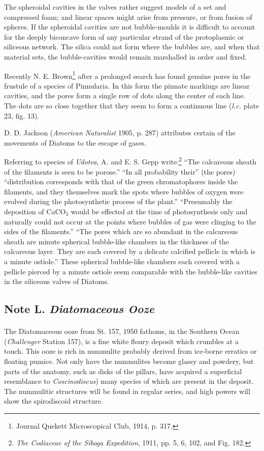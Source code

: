 \documentclass[a4paper, 12pt, oneside]{article}
\begin{document}
The spheroidal cavities in the valves rather suggest models of a set and compressed foam; and linear spaces might arise from pressure, or from fusion of spheres. If the spheroidal cavities are not bubble-moulds it is difficult to account for the deeply biconcave form of any particular strand of the protoplasmic or siliceous network. The silica could not form where the bubbles are, and when that material sets, the bubble-cavities would remain marshalled in order and fixed.

Recently N. E. Brown\footnote{Journal Quekett Microscopical Club, 1914, p. 317.} after a prolonged search has found genuine pores in the frustule of a species of Pinnularia. In this form the pinnate markings are linear cavities, and the pores form a single row of dots along the center of each line. The dots are so close together that they seem to form a continuous line (\emph{l.c.} plate 23, fig. 13).

D. D. Jackson (\emph{American Naturalist} 1905, p. 287) attributes certain of the movements of Diatoms to the escape of gases.

Referring to species of \emph{Udotea}, A. and E. S. Gepp write:\footnote{\emph{The Codiaceae of the \emph{Siboga} Expedition}, 1911, pp. 5, 6, 102, and Fig. 182.} ``The calcareous sheath of the filaments is seen to be porose.'' ``In all probability their'' (the pores) ``distribution corresponds with that of the green chromatophores inside the filaments, and they themselves mark the spots where bubbles of oxygen were evolved during the photosynthetic process of the plant.'' ``Presumably the deposition of CaCO$_{3}$ would be effected at the time of photosynthesis only and naturally could not occur at the points where bubbles of gas were clinging to the sides of the filaments.'' ``The pores which are so abundant in the calcareous sheath are minute spherical bubble-like chambers in the thickness of the calcareous layer. They are each covered by a delicate calcified pellicle in which is a minute ostiole.'' These spherical bubble-like chambers each covered with a pellicle pierced by a minute ostiole seem comparable with the bubble-like cavities in the siliceous valves of Diatoms.

\subsection{Note L. \emph{Diatomaceous Ooze}}
\paragraph{}
The Diatomaceous ooze from St. 157, 1950 fathoms, in the Southern Ocean (\emph{Challenger} Station 157), is a fine white floury deposit which crumbles at a touch. This ooze is rich in nummulite probably derived from ice-borne erratics or floating pumice. Not only have the nummulites become glassy and powdery, but parts of the anatomy, such as disks of the pillars, have acquired a superficial resemblance to \emph{Coscinodiscus}) many species of which are present in the deposit. The nummulitic structures will be found in regular series, and high powers will show the spirodiscoid structure.
\end{document}
